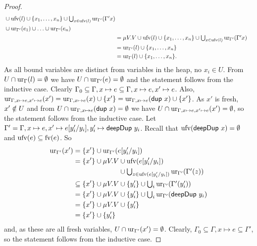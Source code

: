\documentclass[preprint]{sigplanconf}
\theoremstyle{nonumberplain}
\newtheorem{proof}{Proof}
\begin{document}
\begin{proof}
\begin{align*}
\begin{aligned}[t]
&\cup \text{ufv}(l) \cup \{x_1,\ldots,x_n\} \cup \textstyle\bigcup_{x\in \text{ufv}(l)}\text{ur}_{\Gamma'}(\Gamma' x) \\
&\cup \text{ur}_{\Gamma'}(e_1) \cup \ldots \cup \text{ur}_{\Gamma'}(e_n)
\end{aligned}\\
&= \mu V. V \cup \text{ufv}(l) \cup \{x_1,\ldots,x_n\} \cup \textstyle\bigcup_{x\in \text{ufv}(l)}\text{ur}_{\Gamma'}(\Gamma' x)\\
&= \text{ur}_{\Gamma'}(l) \cup \{x_1,\ldots,x_n\}\\
&= \text{ur}_{\Gamma}(l) \cup \{x_1,\ldots,x_n\}.
\end{align*}
As all bound variables are distinct from variables in the heap, no $x_i\in U$. From $U\cap \text{ur}_{\Gamma}(l)
= \emptyset$ we have $U \cap \text{ur}_{\Gamma'}(e) = \emptyset$ and the statement
follows from the inductive case.
Clearly $\Gamma_0 \subseteq \Gamma, x\mapsto e \subseteq \Gamma, x\mapsto e, x' \mapsto e$. Also, $\text{ur}_{\Gamma,x\mapsto e, x'\mapsto e}(x') = \text{ur}_{\Gamma, x\mapsto e}(x) \cup \{x'\} = \text{ur}_{\Gamma, x\mapsto e}(\text{\textsf{dup}}\ x) \cup \{x'\}$. As $x'$ is fresh, $x'\notin U$ and from $U \cap \text{ur}_{\Gamma, x\mapsto e}(\text{\textsf{dup}}\ x)= \emptyset$ we have $U \cap \text{ur}_{\Gamma,x\mapsto e, x' \mapsto e}(x')=\emptyset$, so the statement follows from the inductive case.
Let $\Gamma' = \Gamma, x\mapsto e, x'\mapsto e[y'_i/y_i], y'_i \mapsto \text{\textsf{deepDup}}\ y_i$.
Recall that $\text{ufv}(\text{\textsf{deepDup}}\ x)=\emptyset$ and $\text{ufv}(e) \subseteq \text{fv}(e)$. So 
\begin{align*}
\text{ur}_{\Gamma'}(x')
&= \{x'\} \cup \text{ur}_{\Gamma'}(e[y'_i/y_i]) \\
&= \{x'\} \cup \mu V. V
\begin{aligned}[t]
&\cup \text{ufv}(e[y'_i / y_i])\\
&\cup \textstyle\bigcup_{z \in \text{ufv}(e[y'_i / y_i])} \text{ur}_{\Gamma'}(\Gamma'(z))
\end{aligned}\\
&\subseteq \{x'\} \cup \mu V. V \cup \{y'_i\} \cup \textstyle\bigcup_{i} \text{ur}_{\Gamma'}(\Gamma'(y'_i)) \\
&= \{x'\} \cup \mu V. V \cup \{y'_i\} \cup \textstyle\bigcup_{i} \text{ur}_{\Gamma'}(\text{\textsf{deepDup}}\ y_i)\\
&= \{x'\} \cup \mu V. V \cup \{y'_i\}  \\
&= \{x'\} \cup \{y'_i\}
\end{align*}
and, as these are all fresh variables, $U \cap \text{ur}_{\Gamma'}(x') = \emptyset$. Clearly, $\Gamma_0 \subseteq \Gamma, x\mapsto e \subseteq \Gamma'$, so the statement follows from the inductive case.
\end{proof}
\end{document}
